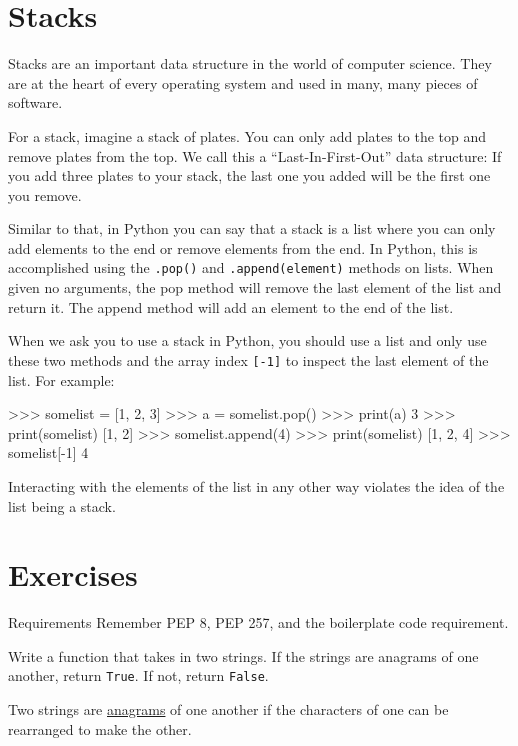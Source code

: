 \documentclass[11pt]{cselabheader}
\begin{document}
\pagebreak
\section{Stacks}
\label{sec:stacks}

Stacks are an important data structure in the world of computer
science. They are at the heart of every operating system and used in many, many
pieces of software.

For a stack, imagine a stack of plates. You can only add plates to the top and
remove plates from the top. We call this a ``Last-In-First-Out'' data structure:
If you add three plates to your stack, the last one you added will be the first
one you remove.

Similar to that, in Python you can say that a stack
is a list where you can only add elements to the end or remove elements from the
end. In Python, this is accomplished using the
\lstinline!.pop()! and \lstinline!.append(element)! methods on lists. When given
no arguments, the pop method will remove the last element of the list and return
it. The append method will add an element to the end of the list.

When we ask you to use a stack in Python, you should use a list and only use
these two methods and the array index \lstinline![-1]! to inspect the last
element of the list. For example:

\begin{pyconcode}
>>> somelist = [1, 2, 3]
>>> a = somelist.pop()
>>> print(a)
3
>>> print(somelist)
[1, 2]
>>> somelist.append(4)
>>> print(somelist)
[1, 2, 4]
>>> somelist[-1]
4
\end{pyconcode}

Interacting with the elements of the list in any other way violates the
idea of the list being a stack.

\pagebreak

\section{Exercises}
\label{sec:ex}

\begin{warningbox}{Requirements}
  Remember PEP 8, PEP 257, and the boilerplate code requirement.
\end{warningbox}

\begin{ex}[anagrams.py] Write a function that takes in two strings. If the strings
  are anagrams of one another, return \lstinline{True}. If not, return
  \lstinline{False}.

  Two strings are \href{http://en.wikipedia.org/wiki/Anagram}{anagrams} of one
  another if the characters of one can be rearranged to make the other.
\end{ex}
\end{document}
